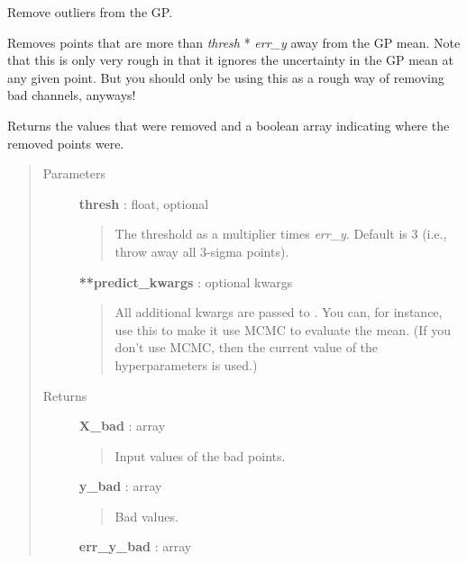 \documentclass[letterpaper,10pt,english]{sphinxmanual}
\begin{document}
\begin{fulllineitems}
\begin{fulllineitems}
\end{fulllineitems}


\begin{fulllineitems}
\label{gptools:gptools.gaussian_process.GaussianProcess.remove_outliers}
Remove outliers from the GP.

Removes points that are more than \emph{thresh} * \emph{err\_y} away from the GP
mean. Note that this is only very rough in that it ignores the
uncertainty in the GP mean at any given point. But you should only be
using this as a rough way of removing bad channels, anyways!

Returns the values that were removed and a boolean array indicating
where the removed points were.
\begin{quote}\begin{description}
\item[{Parameters}] \leavevmode
\textbf{thresh} : float, optional
\begin{quote}

The threshold as a multiplier times \emph{err\_y}. Default is 3 (i.e.,
throw away all 3-sigma points).
\end{quote}

\textbf{**predict\_kwargs} : optional kwargs
\begin{quote}

All additional kwargs are passed to {\hyperref[gptools:gptools.gaussian_process.GaussianProcess.predict]{}}. You can, for
instance, use this to make it use MCMC to evaluate the mean. (If you
don't use MCMC, then the current value of the hyperparameters is
used.)
\end{quote}

\item[{Returns}] \leavevmode
\textbf{X\_bad} : array
\begin{quote}

Input values of the bad points.
\end{quote}

\textbf{y\_bad} : array
\begin{quote}

Bad values.
\end{quote}

\textbf{err\_y\_bad} : array
\begin{quote}


\end{quote}
\end{description}
\end{quote}
\end{fulllineitems}
\end{fulllineitems}
\end{document}
